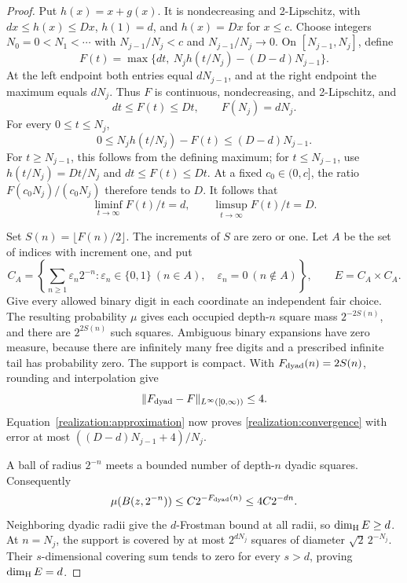 \begin{proof}
Put \(h(x)=x+g(x)\). It is nondecreasing and 2-Lipschitz, with
\(dx\le h(x)\le Dx\), \(h(1)=d\), and \(h(x)=Dx\) for
\(x\le c\). Choose integers \(N_0=0<N_1<\cdots\) with
\(N_{j-1}/N_j<c\) and \(N_{j-1}/N_j\to0\). On
\([N_{j-1},N_j]\), define
\begin{equation}\label{realization:construction}
 F(t)=\max\{dt,\ N_jh(t/N_j)-(D-d)N_{j-1}\}.
\end{equation}
At the left endpoint both entries equal \(dN_{j-1}\), and at the
right endpoint the maximum equals \(dN_j\). Thus \(F\) is continuous,
nondecreasing, and 2-Lipschitz, and
\[
 dt\le F(t)\le Dt,\qquad F(N_j)=dN_j.
\]
For every \(0\le t\le N_j\),
\begin{equation}\label{realization:approximation}
 0\le N_jh(t/N_j)-F(t)\le(D-d)N_{j-1}.
\end{equation}
For \(t\ge N_{j-1}\), this follows from the defining maximum; for
\(t\le N_{j-1}\), use \(h(t/N_j)=Dt/N_j\) and \(dt\le F(t)\le Dt\).
At a fixed \(c_0\in(0,c]\), the ratio \(F(c_0N_j)/(c_0N_j)\)
therefore tends to \(D\). It follows that
\[
 \liminf_{t\to\infty}F(t)/t=d,\qquad
 \limsup_{t\to\infty}F(t)/t=D.
\]

Set \(S(n)=\lfloor F(n)/2\rfloor\). The increments of \(S\) are
zero or one. Let \(A\) be the set of indices with increment one, and put
\[
 C_A=\left\{\sum_{n\ge1}\varepsilon_n2^{-n}:
 \varepsilon_n\in\{0,1\}\ (n\in A),\quad
 \varepsilon_n=0\ (n\notin A)\right\},\qquad E=C_A\times C_A.
\]
Give every allowed binary digit in each coordinate an independent fair
choice. The resulting probability \(\mu\) gives each occupied depth-\(n\)
square mass \(2^{-2S(n)}\), and there are \(2^{2S(n)}\) such squares.
Ambiguous binary expansions have zero measure, because there are infinitely
many free digits and a prescribed infinite tail has probability zero.
The support is compact. With \(F_{\rm dyad}(n)=2S(n)\), rounding and
interpolation give
\[
 \|F_{\rm dyad}-F\|_{L^\infty([0,\infty))}\le4.
\]
Equation~\eqref{realization:approximation} now proves
\eqref{realization:convergence} with error at most
\(((D-d)N_{j-1}+4)/N_j\).

A ball of radius \(2^{-n}\) meets a bounded number of depth-\(n\)
dyadic squares. Consequently
\begin{equation}\label{realization:ball}
 \mu(B(z,2^{-n}))\le C2^{-F_{\rm dyad}(n)}\le4C2^{-dn}.
\end{equation}
Neighboring dyadic radii give the \(d\)-Frostman bound at all radii,
so \(\dim_{\mathrm H} E\ge d\). At \(n=N_j\), the support is covered by at most
\(2^{dN_j}\) squares of diameter \(\sqrt2\,2^{-N_j}\). Their
\(s\)-dimensional covering sum tends to zero for every \(s>d\), proving
\(\dim_{\mathrm H} E=d\).


\end{proof}
